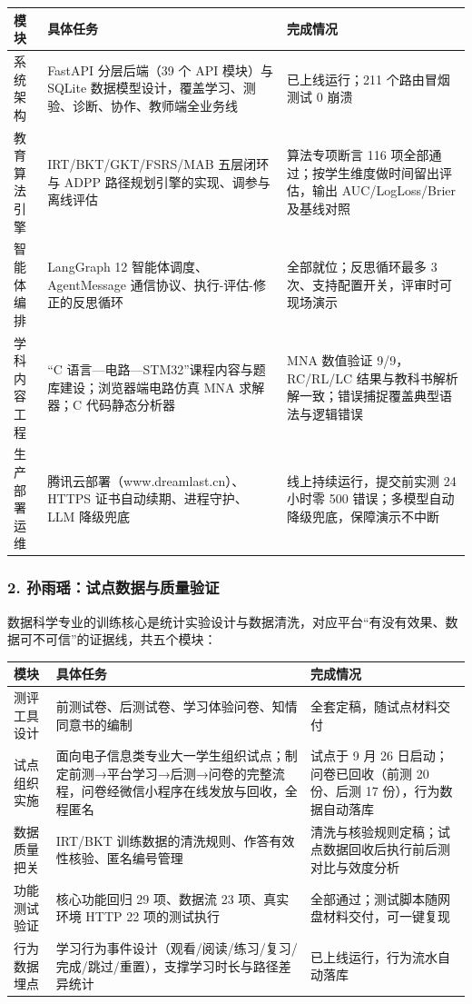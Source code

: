 \documentclass[zihao=-4,a4paper,UTF8,fontset=windows]{ctexart}
\begin{document}
\par\noindent\begin{tabular}{|p{3.0cm}|p{4.5cm}|p{6.2cm}|}
\hline
\textbf{模块} & \textbf{具体任务} & \textbf{完成情况} \\ \hline
系统架构 & FastAPI 分层后端（39 个 API 模块）与 SQLite 数据模型设计，覆盖学习、测验、诊断、协作、教师端全业务线 & 已上线运行；211 个路由冒烟测试 0 崩溃 \\ \hline
教育算法引擎 & IRT/BKT/GKT/FSRS/MAB 五层闭环与 ADPP 路径规划引擎的实现、调参与离线评估 & 算法专项断言 116 项全部通过；按学生维度做时间留出评估，输出 AUC/LogLoss/Brier 及基线对照 \\ \hline
智能体编排 & LangGraph 12 智能体调度、AgentMessage 通信协议、执行-评估-修正的反思循环 & 全部就位；反思循环最多 3 次、支持配置开关，评审时可现场演示 \\ \hline
学科内容工程 & “C 语言—电路—STM32”课程内容与题库建设；浏览器端电路仿真 MNA 求解器；C 代码静态分析器 & MNA 数值验证 9/9，RC/RL/LC 结果与教科书解析解一致；错误捕捉覆盖典型语法与逻辑错误 \\ \hline
生产部署运维 & 腾讯云部署（www.dreamlast.cn）、HTTPS 证书自动续期、进程守护、LLM 降级兜底 & 线上持续运行，提交前实测 24 小时零 500 错误；多模型自动降级兜底，保障演示不中断 \\ \hline
\end{tabular}\par
\subsubsection{2. 孙雨瑶：试点数据与质量验证}


数据科学专业的训练核心是统计实验设计与数据清洗，对应平台“有没有效果、数据可不可信”的证据线，共五个模块：

\par\noindent\begin{tabular}{|p{3.0cm}|p{4.5cm}|p{6.2cm}|}
\hline
\textbf{模块} & \textbf{具体任务} & \textbf{完成情况} \\ \hline
测评工具设计 & 前测试卷、后测试卷、学习体验问卷、知情同意书的编制 & 全套定稿，随试点材料交付 \\ \hline
试点组织实施 & 面向电子信息类专业大一学生组织试点；制定前测→平台学习→后测→问卷的完整流程，问卷经微信小程序在线发放与回收，全程匿名 & 试点于 9 月 26 日启动；问卷已回收（前测 20 份、后测 17 份），行为数据自动落库 \\ \hline
数据质量把关 & IRT/BKT 训练数据的清洗规则、作答有效性核验、匿名编号管理 & 清洗与核验规则定稿；试点数据回收后执行前后测对比与效度分析 \\ \hline
功能测试验证 & 核心功能回归 29 项、数据流 23 项、真实环境 HTTP 22 项的测试执行 & 全部通过；测试脚本随网盘材料交付，可一键复现 \\ \hline
行为数据埋点 & 学习行为事件设计（观看/阅读/练习/复习/完成/跳过/重置），支撑学习时长与路径差异统计 & 已上线运行，行为流水自动落库 \\ \hline
\end{tabular}\par
\end{document}
